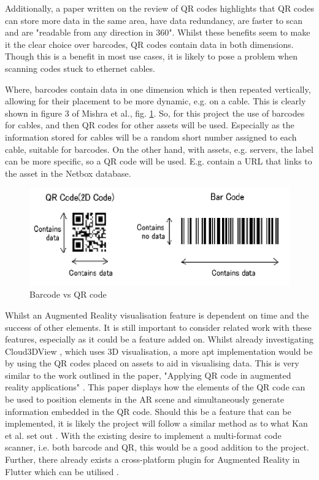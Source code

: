 \documentclass [11pt,a4paper]{article}
\begin{document}
Additionally, a paper written on the review of QR codes highlights that QR codes can store more data in the same area, have data redundancy, are faster to scan and are "readable from any direction in 360\degree"\cite{mishra2017review}.  Whilst these benefits seem to make it the clear choice over barcodes, QR codes contain data in both dimensions. Though this is a benefit in most use cases, it is likely to pose a problem when scanning codes stuck to ethernet cables.

Where, barcodes contain data in one dimension which is then repeated vertically, allowing for their placement to be more dynamic, e.g. on a cable. This is clearly shown in figure 3 of Mishra et al., fig. \ref{fig:barcode}. So, for this project the use of barcodes for cables, and then QR codes for other assets will be used. Especially as the information stored for cables will be a random short number assigned to each cable, suitable for barcodes. On the other hand, with assets, e.g. servers, the label can be more specific, so a QR code will be used. E.g. contain a URL that links to the asset in the Netbox database.

\begin{figure}[H]
\centering
\includegraphics[width=.75\textwidth]{images/barcode_mishra.png}
\caption{Barcode vs QR code}
\label{fig:barcode}
\end{figure}

Whilst an Augmented Reality visualisation feature is dependent on time and the success of other elements. It is still important to consider related work with these features, especially as it could be a feature added on. Whilst already investigating Cloud3DView \cite{cloud3dview}, which uses 3D visualisation, a more apt implementation would be by using the QR codes placed on assets to aid in visualising data. This is very similar to the work outlined in the paper, "Applying QR code in augmented reality applications" \cite{applyingQR}. This paper displays how the elements of the QR code can be used to position elements in the AR scene and simultaneously generate information embedded in the QR code. Should this be a feature that can be implemented, it is likely the project will follow a similar method as to what Kan et al. set out \cite{applyingQR}. With the existing desire to implement a multi-format code scanner, i.e. both barcode and QR, this would be a good addition to the project. Further, there already exists a cross-platform plugin for Augmented Reality in Flutter which can be utilised \cite{ar_flutter}.
\end{document}
